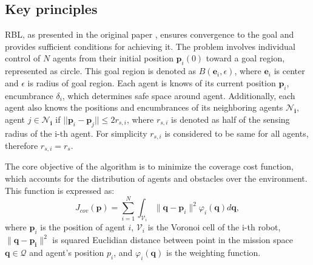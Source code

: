     \subsection{Key principles}
        RBL, as presented in the original paper \cite{rbl_paper}, ensures convergence to the goal and provides sufficient conditions for achieving it. 
        The problem involves individual control of $N$ agents from their initial position $\mathbf{p}_i(0)$ toward a goal region, represented as circle.
        This goal region is denoted as $B(\mathbf{e}_i, \epsilon)$, where $\mathbf{e}_i$ is center and $\epsilon$ is radius of goal region.
        Each agent is knows of its current position $\mathbf{p}_i$, encumbrance $\delta_i$, which determines safe space around agent.
        Additionally, each agent also knows the positions and encumbrances of its neighboring agents $\mathbf{\mathcal{N}_i}$, agent $j \in \mathbf{\mathcal{N}_i}$ if $||\mathbf{p}_i - \mathbf{p}_j|| \leq 2r_{s,i}$, where $r_{s,i}$ is denoted as half of the sensing radius of the i-th agent.
        For simplicity $r_{s,i}$ is considered to be same for all agents, therefore $r_{s,i} = r_s$. 

        The core objective of the algorithm is to minimize the coverage cost function, which accounts for the distribution of agents and obstacles over the environment. 
        This function is expressed as:
        \begin{equation}
            J_{cov}(\mathbf{p}) = \sum_{i=1}^{N} \int_{\mathcal{V}_i} \lVert\mathbf{q}-\mathbf{p}_i\rVert^2 \varphi_i (\mathbf{q})d\mathbf{q},
            \label{coverage_cost_function}
        \end{equation}
        where $\mathbf{p}_i$ is the position of agent $i$, $\mathcal{V}_i$ is the Voronoi cell of the i-th robot, $\lVert\mathbf{q}-\mathbf{p_i}\rVert^2$ is squared Euclidian distance between point in the mission space $\mathbf{q} \in \mathcal{Q}$ and agent's position $p_i$, 
        and $\varphi_i (\mathbf{q})$ is the weighting function.

